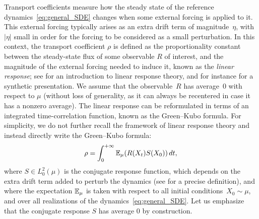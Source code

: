 Transport coefficients measure how the steady state of the reference dynamics~\eqref{eq:general_SDE} changes when some external forcing is applied to it. This external forcing typically arises as an extra drift term of magnitude~$\eta$, with~$|\eta|$ small in order for the forcing to be considered as a small perturbation. In this context, the transport coefficient $\rho$ is defined as the proportionality constant between the steady-state flux of some observable $R$ of interest, and the magnitude of the external forcing needed to induce it, known as the \emph{linear response}; see \cite[Chapter 8]{chandler1987} for an introduction to linear response theory, and for instance \cite[Section 2]{synthetic2023} for a synthetic presentation. We assume that the observable~$R$ has average~0 with respect to $\mu$ (without loss of generality, as it can always be recentered in case it has a nonzero average). The linear response can be reformulated in terms of an integrated time-correlation function, known as the Green--Kubo formula. For simplicity, we do not further recall the framework of linear response theory and instead directly write the Green--Kubo formula:
%
\begin{align}
	\rho = \int_0^{+\infty} \E_\mu(R(X_t) S(X_0)) \, dt,%
	\label{eq:gk}
\end{align}
%
where $S \in L^2_0(\mu)$ is the conjugate response function, which depends on the extra drift term added to perturb the dynamics (see \cite[Section 5.2.3]{acta_numerica2016} for a precise definition), and where the expectation $\mathbb{E}_\mu$ is taken with respect to all initial conditions~$X_0\sim \mu$, and over all realizations of the dynamics~\eqref{eq:general_SDE}. Let us emphasize that the conjugate response $S$ has average 0 by construction.%

